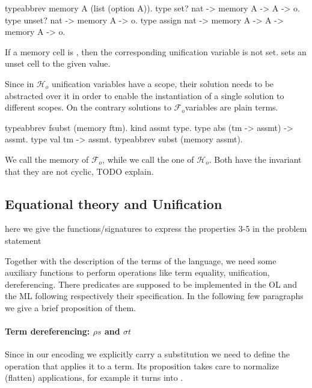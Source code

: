 \documentclass[sigconf,natbib=false]{acmart}
\newcommand{\Fo}{\ensuremath{\mathcal{F}_{\!o}\xspace}} %
\newcommand{\Ho}{\ensuremath{\mathcal{H}_o}\xspace}
\begin{document}
\begin{elpicode}
typeabbrev memory A (list (option A)).
type set?   nat -> memory A -> A -> o.
type unset? nat -> memory A -> o.
type assign nat -> memory A -> A -> memory A -> o.
\end{elpicode}

\noindent 
If a memory cell is , then the corresponding unification variable
is not set.  sets an unset cell to the given value.

Since in \Ho unification variables have a scope, their solution needs to be
abstracted over it in order to enable the instantiation of a single
solution to different scopes. On the contrary solutions to \Fo variables
are plain terms.

\begin{elpicode}
  typeabbrev fsubst (memory ftm).
  kind assmt type.
  type abs (tm -> assmt) -> assmt.
  type val tm -> assmt.
  typeabbrev subst (memory assmt).
\end{elpicode}

\noindent
We call  the memory of \Fo{}, while we call 
the one of \Ho.
Both have the invariant that they are not cyclic, TODO explain.

\subsection{Equational theory and Unification}

here we give the functions/signatures to express the properties 3-5 in the problem
statement

Together with the description of the terms of the language, we need some
auxiliary functions to perform operations like term equality, unification,
dereferencing. There predicates are supposed to be implemented in the OL and the
ML following respectively their specification. In the following few paragraphs
we give a brief proposition of them.

\paragraph{Term dereferencing: $\rho s$ and $\sigma t$}

Since in our encoding we explicitly carry a substitution we need to
define the operation that applies it to a term. Its proposition
takes care to normalize (flatten) applications, for example
it turns
into
.
\end{document}
